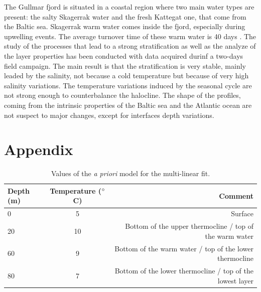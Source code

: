 \documentclass[12pt,a4paper]{article}
\begin{document}
The Gullmar fjord is situated in a coastal region where two main water
types are present: the salty Skagerrak water and the fresh Kattegat one,
that come from the Baltic sea.
Skagerrak warm water comes inside the fjord, especially during upwelling events.
The average turnover time of these warm water is 40 days \citep{arneborg2003}.
The study of the processes that lead to a strong stratification as well as
the analyze of the layer properties has been conducted with data acquired
durinf a two-days field campaign.
The main result is that the stratification is very stable, mainly leaded
by the salinity, not because a cold temperature but because of
very high salinity variations.
The temperature variations induced by the seasonal cycle are not strong
enough to counterbalance the halocline. The shape of the profiles,
coming from the intrinsic properties of the Baltic sea and the Atlantic
ocean are not suspect to major changes, except for interfaces depth variations.

\clearpage
\newpage




\newpage

\appendix

\section{Appendix}

\begin{table}[h]
  \centering
  \begin{tabular}{|l|c|r|}
    \hline
    Depth (m) & Temperature ($^{\circ}$C) & Comment \\
    \hline
    0 & 5 & Surface\\
    20 & 10 & Bottom of the upper thermocline / top of the warm water\\
    60 & 9 & Bottom of the warm water / top of the lower thermocline\\
    80 & 7 & Bottom of the lower thermocline / top of the lowest layer\\
    \hline
  \end{tabular}
  \caption{\label{tab:apriori}Values of the {\it a priori} model for the multi-linear fit.}
\end{table}
\end{document}

